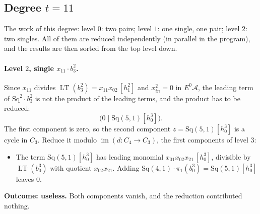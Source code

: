 \documentclass[11pt]{article}
\newcommand{\Sq}{\mathrm{Sq}}
\newcommand{\A}{\mathcal{A}}
\DeclareMathOperator{\LT}{LT}
\begin{document}
\subsection*{Degree $t = 11$}
\noindent The work of this degree: level $0$: two pairs; level $1$: one single, one pair; level $2$: two singles. All of them are reduced independently (in parallel in the program), and the results are then sorted from the top level down.
\medskip
\paragraph{Level $2$, single $x_{11}\cdot b^{2}_{3}$.} Since $x_{11}$ divides $\LT(b^{2}_{3}) = x_{11}x_{02}\,[h_1^2]$ and $x_{in}^2 = 0$ in $E^0\A$, the leading term of $\Sq^{2}\cdot b^{2}_{3}$ is not the product of the leading terms, and the product has to be reduced:
\[\bigl(0 \;\big|\; \Sq(5,1)[h_0^3]\bigr).\]
The first component is zero, so the second component $z = \Sq(5,1)[h_0^3]$ is a cycle in $C_{3}$.
Reduce it modulo $\operatorname{im}(d\colon C_{4}\to C_{3})$, the first components of level $3$:
\begin{itemize}
\item The term $\Sq(5,1)[h_0^3]$ has leading monomial $x_{01}x_{02}x_{21}\,[h_0^3]$, divisible by $\LT(b^{3}_{0})$ with quotient $x_{02}x_{21}$. Adding $\Sq(4,1)\cdot \pi_1(b^{3}_{0}) = \Sq(5,1)[h_0^3]$ leaves $0$.
\end{itemize}
\textbf{Outcome: useless.} Both components vanish, and the reduction contributed nothing.
\medskip
\end{document}
